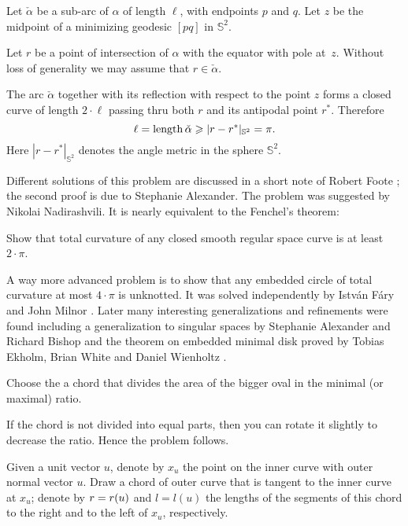 Let $\check\alpha$ be a sub-arc of $\alpha$ of length $\ell$, with endpoints $p$ and $q$. 
Let $z$ be the midpoint of a minimizing geodesic $[pq]$ in $\mathbb{S}^2$. 

Let $r$ be a point of intersection of $\alpha$ with the equator with pole at~$z$. 
Without loss of generality we may assume that $r\in\check\alpha$. 

The arc $\check\alpha$ together with its reflection with respect to the point $z$ forms a closed curve of length $2\cdot \ell$ passing thru both $r$ and its antipodal point $r^{*}$.
Therefore 
\[\ell=\operatorname{\rm length} \check\alpha\geqslant |r-r^{*}|_{\mathbb S^2}=\pi.\]
Here $|r-r^{*}|_{\mathbb S^2}$ 
denotes the angle metric in the sphere $\mathbb S^2$.\qeds

Different solutions of this problem are discussed in a short note of Robert Foote \cite{foote};
the second proof is due to Stephanie Alexander.
The problem was suggested by Nikolai Nadirashvili.
It is nearly equivalent to the Fenchel's theorem: 

\begin{pr}
Show that total curvature of any closed smooth regular space curve is at least $2\cdot\pi$.
\end{pr}

A way more advanced problem is to show that any embedded circle of total curvature at most $4\cdot\pi$ is unknotted.
It was solved independently by Istv{\'a}n F{\'a}ry \cite{fary-knot} and John Milnor \cite{milnor}. 
Later many interesting generalizations and refinements were found including a generalization to singular spaces 
by Stephanie Alexander and Richard Bishop \cite{alexander-bishop:knot} and the
theorem on embedded minimal disk proved by Tobias Ekholm, 
Brian White
and Daniel Wienholtz \cite{EWW}.

Choose the a chord that divides the area of the bigger oval in the minimal (or maximal) ratio.

If the chord is not divided into equal parts, then you can rotate it slightly
to decrease the ratio.
Hence the problem follows.
\qeds

Given a unit vector $u$, denote by $x_u$ the point on the inner curve
with outer normal vector $u$.
Draw a chord of outer curve that is tangent to the inner curve at $x_u$;
denote by $r\z=r(u)$ and $l=l(u)$ the lengths of the segments of this chord to the right and to the left of $x_u$, respectively.

